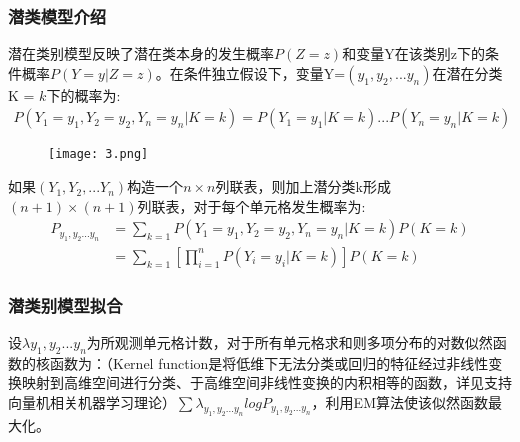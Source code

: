 \documentclass[cn]{elegantpaper}
\begin{document}
\subsubsection{潜类模型介绍}
潜在类别模型反映了潜在类本身的发生概率$P(Z=z)$和变量Y在该类别z下的条件概率$P(Y=y|Z=z)$。在条件独立假设下，变量Y=$(y_{1},y_{2},...y_{n})$在潜在分类K = $k$下的概率为:
{\setlength\abovedisplayskip{5pt}
\setlength\belowdisplayskip{0pt}
\begin{equation} 
\begin{split}
P(Y_{1}=y_{1},Y_{2}=y_{2},Y_{n}=y_{n}|K=k)=P(Y_{1}=y_{1}|K=k)...P(Y_{n}=y_{n}|K=k)
\end{split}
\end{equation}}
\begin{figure}[H]
	\centering
	\texttt{[image: 3.png]}
\end{figure}
如果$(Y_{1},Y_{2},...Y_{n})$构造一个${n}\times{n}$列联表，则加上潜分类k形成${(n+1)}\times{(n+1)}$列联表，对于每个单元格发生概率为:
{\setlength\abovedisplayskip{5pt}
\setlength\belowdisplayskip{5pt}
\begin{equation} 
\begin{split}
P_{y_{1},y_{2}...y_{n}}&=\sum_{k=1} P(Y_{1}=y_{1},Y_{2}=y_{2},Y_{n}=y_{n}|K=k)P(K=k)\\
& = \sum_{k=1}{[\prod_{i=1}^{n} {P(Y_{i}=y_{i}|K=k)}]P(K=k)}
\end{split}
\end{equation}}

\subsubsection{潜类别模型拟合}
设{$\lambda y_{1},y_{2}...y_{n}$}为所观测单元格计数，对于所有单元格求和则多项分布的对数似然函数的核函数为：（Kernel function是将低维下无法分类或回归的特征经过非线性变换映射到高维空间进行分类、于高维空间非线性变换的内积相等的函数，详见支持向量机相关机器学习理论）$\sum{\lambda_{y_{1},y_{2}...y_{n}} log P_{y_{1},y_{2}...y_{n}}}$，利用EM算法使该似然函数最大化。

\end{document}

